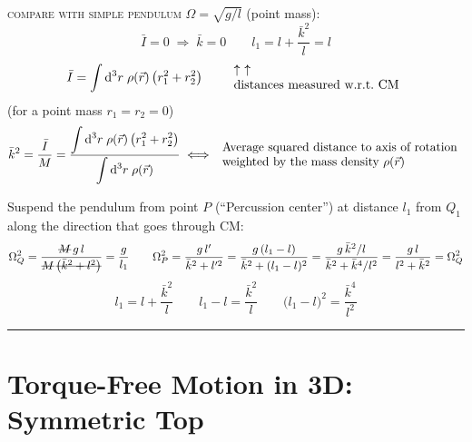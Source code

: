 \documentclass[11pt]{article}
\newcommand{\mstruck}[1]{\text{\retracted{\ensuremath{#1}}}}
\begin{document}
\textsc{compare with simple pendulum} $\Omega = \sqrt{g/l}$ (point mass):
\begin{equation*}
\bar{I} = 0 \;\Longrightarrow\; \bar{k} = 0
\qquad
l_1 = l + \frac{\bar{k}^{2}}{l} = l
\end{equation*}
\begin{equation*}
\bar{I} = \int \d^{3}r\;\rho(\vec{r})\,\bigl(r_1^{2}+r_2^{2}\bigr)
\qquad
\begin{array}{l}\uparrow\ \uparrow\\ \text{distances measured w.r.t.\ CM}\end{array}
\end{equation*}
(for a point mass $r_1 = r_2 = 0$)
\begin{equation*}
\bar{k}^{2} = \frac{\bar{I}}{M}
= \frac{\displaystyle\int \mathrm{d}^{3}r\;\rho(\vec{r})\,\bigl(r_1^{2}+r_2^{2}\bigr)}{\displaystyle\int \mathrm{d}^{3}r\;\rho(\vec{r})}
\;\Longleftrightarrow\;
\begin{array}{l}\text{Average squared distance to axis of rotation}\\
\text{weighted by the mass density }\rho(\vec{r})\end{array}
\end{equation*}

Suspend the pendulum from point $P$ (``Percussion center'') at distance $l_1$ from $Q_1$
along the direction that goes through CM:
\begin{equation*}
\Omega_Q^{2} = \frac{\mstruck{M}\,g\,l}{\mstruck{M}\,\mstruck{\bigl(\bar{k}^{2}+l^{2}\bigr)}} = \frac{g}{l_1}
\qquad
\Omega_P^{2} = \frac{g\,l'}{\bar{k}^{2}+l'^{2}}
= \frac{g\,(l_1-l)}{\bar{k}^{2}+(l_1-l)^{2}}
= \frac{g\,\bar{k}^{2}/l}{\bar{k}^{2}+\bar{k}^{4}/l^{2}}
= \frac{g\,l}{l^{2}+\bar{k}^{2}} = \Omega_Q^{2}
\end{equation*}
\begin{equation*}
l_1 = l + \frac{\bar{k}^{2}}{l}
\qquad
l_1 - l = \frac{\bar{k}^{2}}{l}
\qquad
\bigl(l_1-l\bigr)^{2} = \frac{\bar{k}^{4}}{l^{2}}
\end{equation*}

\bigskip\hrule\bigskip

\section*{Torque-Free Motion in 3D: Symmetric Top}
\end{document}
